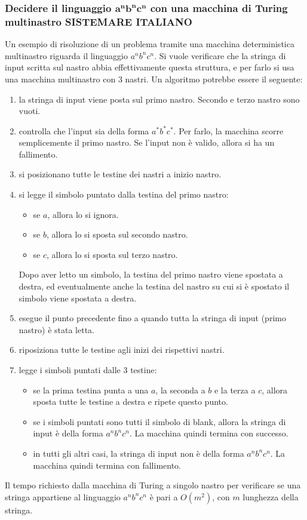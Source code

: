 \subsubsection{Decidere il linguaggio $\mathbf{a^nb^nc^n}$ con una macchina di Turing multinastro SISTEMARE ITALIANO}
Un esempio di risoluzione di un problema tramite una macchina deterministica multinastro riguarda il linguaggio $a^nb^nc^n$.
Si vuole verificare che la stringa di input scritta sul nastro abbia effettivamente questa struttura, e per farlo si usa una macchina multinastro con 3 nastri.
Un algoritmo potrebbe essere il seguente:
\begin{enumerate}
    \item la stringa di input viene posta sul primo nastro. Secondo e terzo nastro sono vuoti.
    \item controlla che l'input sia della forma $a^*b^*c^*$. Per farlo, la macchina scorre semplicemente il primo nastro.
    Se l'input non è valido, allora si ha un fallimento.
    \item si posizionano tutte le testine dei nastri a inizio nastro.
    \item si legge il simbolo puntato dalla testina del primo nastro:
    \begin{itemize}
        \item se $a$, allora lo si ignora.
        \item se $b$, allora lo si sposta sul secondo nastro.
        \item se $c$, allora lo si sposta sul terzo nastro.
    \end{itemize}
    Dopo aver letto un simbolo, la testina del primo nastro viene spostata a destra, ed eventualmente anche la testina del nastro su cui si è spostato il simbolo viene spostata a destra.
    \item esegue il punto precedente fino a quando tutta la stringa di input (primo nastro) è stata letta.
    \item riposiziona tutte le testine agli inizi dei rispettivi nastri.
    \item legge i simboli puntati dalle 3 testine:
    \begin{itemize}
        \item se la prima testina punta a una $a$, la seconda a $b$ e la terza a $c$, allora sposta tutte le testine a destra e ripete questo punto.
        \item se i simboli puntati sono tutti il simbolo di blank, allora la stringa di input è della forma $a^nb^nc^n$. La macchina quindi termina con successo.
        \item in tutti gli altri casi, la stringa di input non è della forma $a^nb^nc^n$. La macchina quindi termina con fallimento.
    \end{itemize}
\end{enumerate}

\begin{rem}
    Il tempo richiesto dalla macchina di Turing a singolo nastro per verificare se una stringa appartiene al linguaggio $a^nb^nc^n$ è pari a $O(m^2)$, con $m$ lunghezza della stringa.
\end{rem}